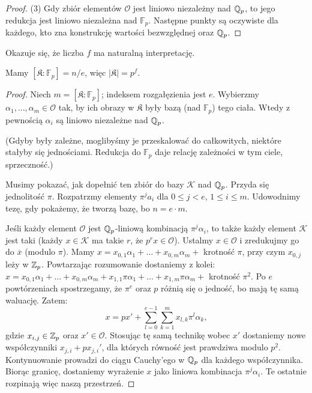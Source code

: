 \begin{proof}(3)
	Gdy zbiór elementów $\mathcal O$ jest liniowo niezależny nad $\mathbb Q_p$, to jego redukcja jest liniowo niezależna nad $\mathbb F_p$.
Następne punkty są oczywiste dla każdego, kto zna konstrukcję wartości bezwzględnej oraz $\mathbb Q_p$.
\end{proof}

Okazuje się, że liczba $f$ ma naturalną interpretację.

\begin{fakt}
	Mamy $[\mathfrak K : \mathbb F_p] = n/e$, więc $|\mathfrak K| = p^f$.
\end{fakt}

\begin{proof}
	Niech $m = [\mathfrak K : \mathbb F_p]$; indeksem rozgałęzienia jest $e$.
	Wybierzmy $\alpha_1, \dots, \alpha_m \in \mathcal O$ tak, by ich obrazy w $\mathfrak K$ były bazą (nad $\mathbb F_p$) tego ciała.
	Wtedy z pewnością $\alpha_i$ są liniowo niezależne nad $\mathbb Q_p$.

	(Gdyby były zależne, moglibyśmy je przeskalować do całkowitych, niektóre stałyby się jednościami.
	Redukcja do $\mathbb F_p$ daje relację zależności w tym ciele, sprzeczność.)

	Musimy pokazać, jak dopełnić ten zbiór do bazy $\mathcal K$ nad $\mathbb Q_p$.
	Przyda się jednolitość $\pi$. Rozpatrzmy elementy $\pi^j a_i$ dla $0 \le j < e$, $1 \le i \le m$.
	Udowodnimy tezę, gdy pokażemy, że tworzą bazę, bo $n = e \cdot m$.

	Jeśli każdy element $\mathcal O$ jest $\mathbb Q_p$-liniową kombinacją $\pi^j \alpha_i$, to także każdy element $\mathcal K$ jest taki (każdy $x \in \mathcal K$ ma takie $r$, że $p^r x \in \mathcal O$).
	Ustalmy $x \in \mathcal O$ i zredukujmy go do $\overline x$ (modulo $\pi$).
	Mamy $x = x_{0,1} \alpha_1 + \dots + x_{0,m}\alpha_m +$ krotność $\pi$, przy czym $x_{0,j}$ leży w $\mathbb Z_p$.
	Powtarzając rozumowanie dostaniemy z kolei:
	$x = x_{0,1} \alpha_1 + \dots + x_{0,m}\alpha_m + x_{1,1} \pi \alpha_1 + \dots + x_{1,m} \pi \alpha_m + $ krotność $\pi^2$.
	Po $e$ powtórzeniach spostrzegamy, że $\pi^e$ oraz $p$ różnią się o jedność, bo mają tę samą waluację.
	Zatem:
	\[
		x = px' + \sum_{l=0}^{e-1} \sum_{k=1}^m x_{l,k} \pi^l \alpha_k,
	\]
	gdzie $x_{i,j} \in \mathbb Z_p$ oraz $x' \in \mathcal O$.
	Stosując tę samą technikę wobec $x'$ dostaniemy nowe współczynniki $x_{j,i} + px_{j,i}'$, dla których równość jest prawdziwa modulo $p^2$.
	Kontynuowanie prowadzi do ciągu Cauchy'ego w $\mathbb Q_p$ dla każdego współczynnika.
	Biorąc granicę, dostaniemy wyrażenie $x$ jako liniowa kombinacja $\pi^j \alpha_i$.
	Te ostatnie rozpinają więc naszą przestrzeń.


\end{proof}
